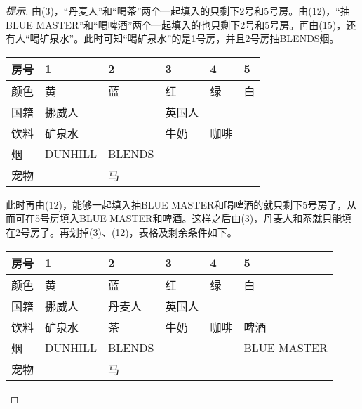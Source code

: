 \begin{proof}[提示]
    由(3)，“丹麦人”和“喝茶”两个一起填入的只剩下2号和5号房。由(12)，“抽BLUE MASTER”和“喝啤酒”两个一起填入的也只剩下2号和5号房。再由(15)，还有人“喝矿泉水”。此时可知“喝矿泉水”的是1号房，并且2号房抽BLENDS烟。
    \begin{center}
      \renewcommand*{\arraystretch}{1.0}
      \begin{tabular}{l|l|l|l|l|l}
        \hline
        房号     & 1      & 2      & 3     & 4     & 5\\\hline
        颜色     & 黄     & 蓝     & 红    & 绿    &白\\\hline
        国籍     & 挪威人 &        & 英国人&       &  \\\hline
        饮料     & 矿泉水 &        & 牛奶  & 咖啡  &  \\\hline
        烟       & DUNHILL& BLENDS &       &       &  \\\hline
        宠物     &        & 马     &       &       &  \\
        \hline
      \end{tabular}
    \end{center}

    此时再由(12)，能够一起填入抽BLUE MASTER和喝啤酒的就只剩下5号房了，从而可在5号房填入BLUE MASTER和啤酒。这样之后由(3)，丹麦人和苶就只能填在2号房了。再划掉(3)、(12)，表格及剩余条件如下。
    \begin{center}
      \renewcommand*{\arraystretch}{1.0}
      \begin{tabular}{l|l|l|l|l|l}
        \hline
        房号     & 1      & 2      & 3     & 4     & 5           \\\hline
        颜色     & 黄     & 蓝     & 红    & 绿    &白           \\\hline
        国籍     & 挪威人 & 丹麦人 & 英国人&       &             \\\hline
        饮料     & 矿泉水 & 茶     & 牛奶  & 咖啡  &啤酒         \\\hline
        烟       & DUNHILL& BLENDS &       &       &BLUE MASTER  \\\hline
        宠物     &        & 马     &       &       &  \\
        \hline
      \end{tabular}
    \end{center}


\end{proof}
